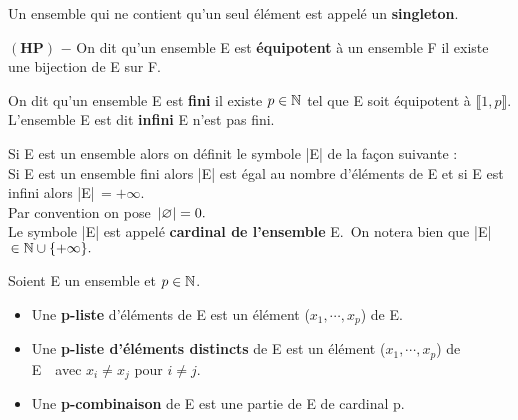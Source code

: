 \vspace{1cm}

Un ensemble qui ne contient qu'un seul élément est appelé un \textbf{singleton}.

\vspace{1cm}

\(\left(\mathbf{H}\mathbf{P}\right)\) $-$ On dit qu'un ensemble E est \textbf{équipotent} à un ensemble F \ssi il existe une bijection de E sur F.

\vspace{1cm}

\noindent On dit qu'un ensemble E est \textbf{fini} \ssi il existe \(p\in \mathbb{N}\) tel que E soit équipotent à \(\llbracket 1,p \rrbracket\). L'ensemble E est dit \textbf{infini} \ssi E n'est pas fini.

\vspace{1cm}

Si E est un ensemble alors on définit le symbole |E| de la façon suivante :\\
Si E est un ensemble fini alors |E| est égal au nombre d'éléments de E et si E est infini alors |E|\(\,=+\infty\).\\
Par convention on pose \(\,|\varnothing|=0.\vspace{0.1cm}\)\\ 
Le symbole |E| est appelé \textbf{cardinal de l'ensemble} E.\, On notera bien que |E|\(\, \in \mathbb{N}\cup \{+\infty\}.\)

\vspace{1.1cm}

Soient E un ensemble et \(p\in \mathbb{N}\).\vspace{-0.1cm}
\begin{itemize}[leftmargin=0.3cm, label=•]
    \item Une \textbf{p-liste} d'éléments de E est un élément (\(x_1,\cdots,x_p\)) de E.
    
    \item Une \textbf{p-liste d'éléments distincts} de E est un élément (\(x_1,\cdots,x_p\)) de E\ \ avec \(x_i\neq x_j\) pour \(i\neq j\).
    
    \item Une \textbf{p-combinaison} de E est une partie de E de cardinal p.
\end{itemize}

\vspace{1cm}

